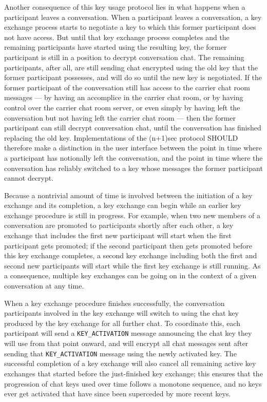 \documentclass{article}
\def\npmessage#1{\texttt{#1}}
\begin{document}
Another consequence of this key usage protocol lies in what happens when a participant leaves a conversation.
When a participant leaves a conversation, a key exchange process starts to negotiate a key to which this former participant does not have access.
But until that key exchange process completes and the remaining participants have started using the resulting key, the former participant is still in a position to decrypt conversation chat.
The remaining participants, after all, are still sending chat encrypted using the old key that the former participant possesses, and will do so until the new key is negotiated.
If the former participant of the conversation still has access to the carrier chat room messages --- by having an accomplice in the carrier chat room, or by having control over the carrier chat room server, or even simply by having left the conversation but not having left the carrier chat room --- then the former participant can still decrypt conversation chat, until the conversation has finished replacing the old key.
Implementations of the (n+1)sec protocol SHOULD therefore make a distinction in the user interface between the point in time where a participant has notionally left the conversation, and the point in time where the conversation has reliably switched to a key whose messages the former participant cannot decrypt.

Because a nontrivial amount of time is involved between the initiation of a key exchange and its completion, a key exchange can begin while an earlier key exchange procedure is still in progress.
For example, when two new members of a conversation are promoted to participants shortly after each other, a key exchange that includes the first new participant will start when the first participant gets promoted; if the second participant then gets promoted before this key exchange completes, a second key exchange including both the first and second new participants will start while the first key exchange is still running.
As a consequence, multiple key exchanges can be going on in the context of a given conversation at any time.

When a key exchange procedure finishes successfully, the conversation participants involved in the key exchange will switch to using the chat key produced by the key exchange for all further chat.
To coordinate this, each participant will send a \npmessage{KEY\_ACTIVATION} message announcing the chat key they will use from that point onward, and will encrypt all chat messages sent after sending that \npmessage{KEY\_ACTIVATION} message using the newly activated key.
The successful completion of a key exchange will also cancel all remaining active key exchanges that started before the just-finished key exchange; this ensures that the progression of chat keys used over time follows a monotone sequence, and no keys ever get activated that have since been superceded by more recent keys.
\end{document}

